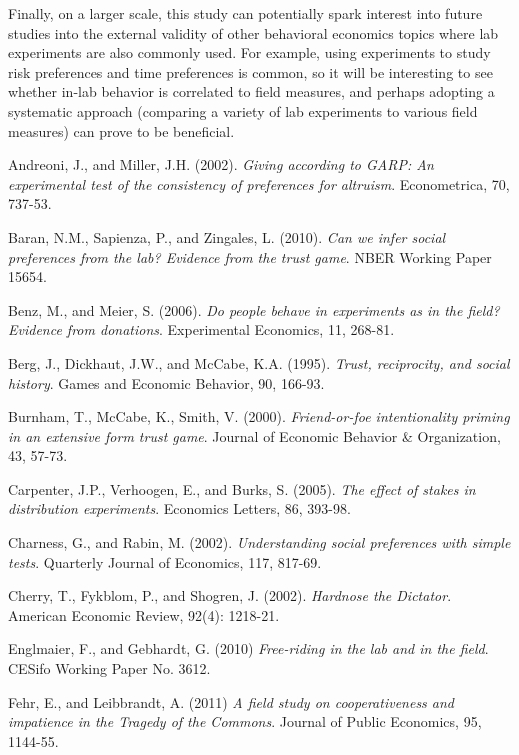 \documentclass[12pt]{article}
\begin{document}
Finally, on a larger scale, this study can potentially spark interest into future studies into the external validity of other behavioral economics topics where lab experiments are also commonly used. For example, using experiments to study risk preferences and time preferences is common, so it will be interesting to see whether in-lab behavior is correlated to field measures, and perhaps adopting a systematic approach (comparing a variety of lab experiments to various field measures) can prove to be beneficial.
 \newpage
\begin{thebibliography}{9}

Andreoni, J., and Miller, J.H. (2002).
\textit{Giving according to GARP: An experimental test of the consistency of preferences for altruism}.
Econometrica, 70, 737-53.

Baran, N.M., Sapienza, P., and Zingales, L. (2010).
\textit{Can we infer social preferences from the lab? Evidence from the trust game}.
NBER Working Paper 15654.

Benz, M., and Meier, S. (2006).
\textit{Do people behave in experiments as in the field? Evidence from donations}.
Experimental Economics, 11, 268-81.

Berg, J., Dickhaut, J.W., and McCabe, K.A. (1995).
\textit{Trust, reciprocity, and social history}.
Games and Economic Behavior, 90, 166-93.

Burnham, T., McCabe, K., Smith, V. (2000).
\textit{Friend-or-foe intentionality priming in an extensive form trust game}.
Journal of Economic Behavior \& Organization, 43, 57-73.

Carpenter, J.P., Verhoogen, E., and Burks, S. (2005).
\textit{The effect of stakes in distribution experiments}.
Economics Letters, 86, 393-98.

Charness, G., and Rabin, M. (2002).
\textit{Understanding social preferences with simple tests}.
Quarterly Journal of Economics, 117, 817-69.

Cherry, T., Fykblom, P., and Shogren, J. (2002).
\textit{Hardnose the Dictator}.
American Economic Review, 92(4): 1218-21.

Englmaier, F., and Gebhardt, G. (2010)
\textit{Free-riding in the lab and in the field}.
CESifo Working Paper No. 3612.

Fehr, E., and Leibbrandt, A. (2011)
\textit{A field study on cooperativeness and impatience in the Tragedy of the Commons}.
Journal of Public Economics, 95, 1144-55.


\end{thebibliography}
\end{document}
